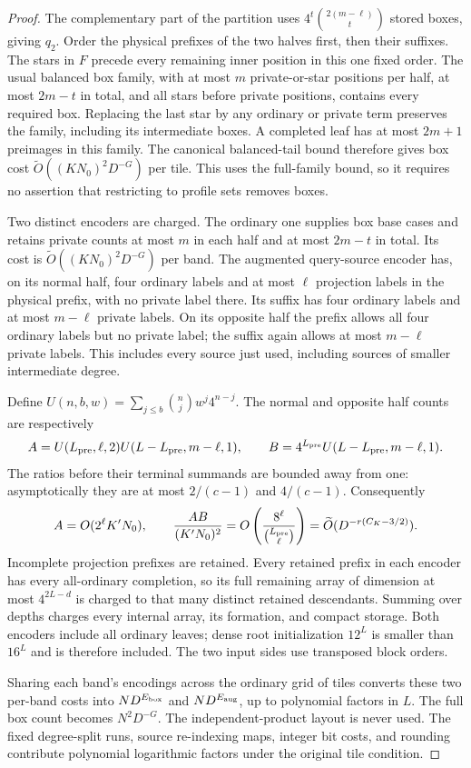 \documentclass[11pt]{article}
\newcommand{\softO}{\widetilde O}
\begin{document}
\begin{proof}
The complementary part of the partition uses
$4^t\binom{2(m-\ell)}t$ stored boxes, giving $q_2$.
Order the physical prefixes of the two halves first, then their suffixes.
The stars in $F$ precede every remaining inner position in this one fixed
order. The usual balanced box family, with at most $m$ private-or-star
positions per half, at most $2m-t$ in total, and all stars before private
positions, contains every required box. Replacing the last star by any
ordinary or private term preserves the family, including its intermediate
boxes. A completed leaf has at most $2m+1$ preimages in this family.
The canonical balanced-tail bound therefore gives box cost
$\softO((KN_0)^2D^{-G})$ per tile. This uses the full-family bound,
so it requires no assertion that restricting to profile sets removes boxes.

Two distinct encoders are charged. The ordinary one supplies box base
cases and retains private counts at most $m$ in each half and at most
$2m-t$ in total. Its cost is $\softO((KN_0)^2D^{-G})$ per band.
The augmented query-source encoder has, on its normal half, four ordinary
labels and at most $\ell$ projection labels in the physical prefix, with
no private label there. Its suffix has four ordinary labels and at most
$m-\ell$ private labels. On its opposite half the prefix allows all four
ordinary labels but no private label; the suffix again allows at most
$m-\ell$ private labels. This includes every source just used, including
sources of smaller intermediate degree.

Define $U(n,b,w)=\sum_{j\le b}\binom njw^j4^{n-j}$.
The normal and opposite half counts are respectively
\[
 A=U(L_{\rm pre},\ell,2)U(L-L_{\rm pre},m-\ell,1),\qquad
 B=4^{L_{\rm pre}}U(L-L_{\rm pre},m-\ell,1).
\]
The ratios before their terminal summands are bounded away from one:
asymptotically they are at most $2/(c-1)$ and $4/(c-1)$.
Consequently
\[
 A=O(2^\ell K'N_0),\qquad
 \frac{AB}{(K'N_0)^2}=O\left(\frac{8^\ell}{\binom{L_{\rm pre}}\ell}\right)
      =\softO(D^{-r(C_K-3/2)}).
\]
Incomplete projection prefixes are retained. Every retained prefix in
each encoder has every all-ordinary completion, so its full remaining
array of dimension at most $4^{2L-d}$ is charged to that many distinct
retained descendants. Summing over depths charges every internal array,
its formation, and compact storage. Both encoders include all ordinary
leaves; dense root initialization $12^L$ is smaller than $16^L$ and is
therefore included. The two input sides use transposed block orders.

Sharing each band's encodings across the ordinary grid of tiles converts
these two per-band costs into $ND^{E_{\rm box}}$ and $ND^{E_{\rm aug}}$,
up to polynomial factors in $L$. The full box count becomes $N^2D^{-G}$.
The independent-product layout is never used. The fixed degree-split
runs, source re-indexing maps, integer bit costs, and rounding contribute
polynomial logarithmic factors under the original tile condition.
\end{proof}
\end{document}

